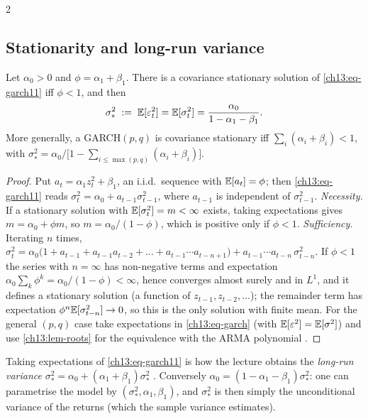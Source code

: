 \begin{paracol}{2}
\subsection{Stationarity and long-run variance}\label{ch13:sec-longrun}
\begin{theorem}\label{ch13:thm-stat}
Let $\alpha_0>0$ and $\phi=\alpha_1+\beta_1$. There is a covariance stationary solution of \eqref{ch13:eq-garch11} iff $\phi<1$, and then
\begin{equation}\label{ch13:eq-longrun}
  \sigma_*^2\;:=\;\mathbb{E}[\varepsilon_t^2]=\mathbb{E}[\sigma_t^2]=\frac{\alpha_0}{1-\alpha_1-\beta_1}.
\end{equation}
More generally, a GARCH$(p,q)$ is covariance stationary iff $\sum_i(\alpha_i+\beta_i)<1$, with $\sigma_*^2=\alpha_0/\bigl[1-\sum_{i\le\max(p,q)}(\alpha_i+\beta_i)\bigr]$.
\end{theorem}
\begin{proof}
Put $a_t=\alpha_1z_t^2+\beta_1$, an i.i.d.\ sequence with $\mathbb{E}[a_t]=\phi$; then \eqref{ch13:eq-garch11} reads $\sigma_t^2=\alpha_0+a_{t-1}\sigma_{t-1}^2$, where $a_{t-1}$ is independent of $\sigma_{t-1}^2$.
\emph{Necessity.} If a stationary solution with $\mathbb{E}[\sigma_t^2]=m<\infty$ exists, taking expectations gives $m=\alpha_0+\phi m$, so $m=\alpha_0/(1-\phi)$, which is positive only if $\phi<1$.
\emph{Sufficiency.} Iterating $n$ times,
$\sigma_t^2=\alpha_0\bigl(1+a_{t-1}+a_{t-1}a_{t-2}+\dots+a_{t-1}\cdots a_{t-n+1}\bigr)+a_{t-1}\cdots a_{t-n}\,\sigma^2_{t-n}$. If $\phi<1$ the series with $n=\infty$
has non-negative terms and expectation $\alpha_0\sum_k\phi^k=\alpha_0/(1-\phi)<\infty$, hence converges almost surely and in $L^1$, and it defines a stationary solution (a function of
$z_{t-1},z_{t-2},\dots$); the remainder term has expectation $\phi^n\mathbb{E}[\sigma^2_{t-n}]\to0$, so this is the only solution with finite mean. For the general $(p,q)$ case take expectations in
\eqref{ch13:eq-garch} (with $\mathbb{E}[\varepsilon^2]=\mathbb{E}[\sigma^2]$) and use \cref{ch13:lem-roots} for the equivalence with the ARMA polynomial .
\end{proof}
Taking expectations of \eqref{ch13:eq-garch11} is how the lecture obtains the \emph{long-run variance} $\sigma_*^2=\alpha_0+(\alpha_1+\beta_1)\sigma_*^2$ . Conversely
$\alpha_0=(1-\alpha_1-\beta_1)\sigma_*^2$: one can parametrise the model by $(\sigma_*^2,\alpha_1,\beta_1)$, and $\sigma_*^2$ is then simply the unconditional variance of the returns (which the
sample variance estimates).


\end{paracol}

